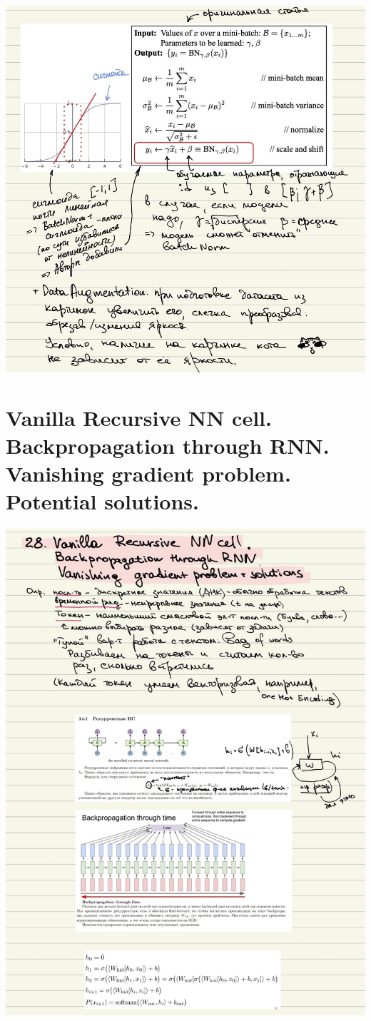 \includegraphics[width=400pt]{images/27_2.JPG}
\newpage

\section{Vanilla Recursive NN cell. Backpropagation through RNN. Vanishing gradient problem. Potential solutions.}
\includegraphics[width=400pt]{images/28_1.JPG}

